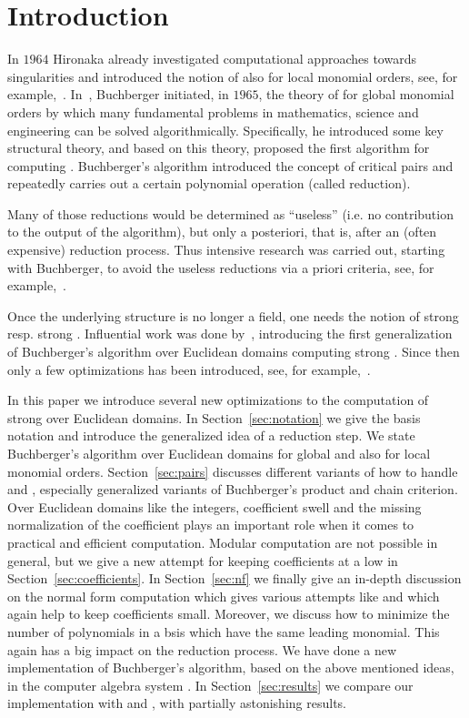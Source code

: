 \section{Introduction}
\label{sec:intro} In $1964$ Hironaka already investigated
computational approaches towards singularities and introduced the notion of
\stbs also for local monomial orders, see, for
example,~\cite{hironaka11964, hironaka21964}.
In~\cite{bGroebner1965, bGroebner1965eng}, Buchberger initiated, in $1965$, the theory
of \gbs for global monomial orders by which many fundamental problems in mathematics, science
and engineering can be solved algorithmically. Specifically, he introduced some key
structural theory, and based on
this theory, proposed the first algorithm for computing \gbs.
Buchberger's algorithm introduced the concept of critical pairs and repeatedly carries out a certain
polynomial operation (called reduction).

Many of those reductions would be
determined as ``useless'' (i.e. no contribution to the output of the algorithm),
but only a posteriori, that is, after an (often expensive) reduction process.
Thus intensive research was carried out, starting with Buchberger, to avoid the
useless reductions via a priori criteria, see,  for
example,~\cite{bGroebnerCriterion1979,buchberger2ndCriterion1985,gmInstallation1988}.

Once the underlying structure is no longer a field, one needs
the notion of strong \gbs resp. strong \stbs. Influential work was done
by~\cite{kapur1988}, introducing the first generalization of Buchberger's
algorithm over Euclidean domains computing strong \gbs. Since then only a few
optimizations has been introduced, see, for example,~\cite{Wienand2011,
    lichtblau2012, eppSigZ2017}.

In this paper we introduce several new optimizations to the computation of
strong \stbs over Euclidean domains. In Section~\ref{sec:notation} we give the
basis notation and introduce the generalized idea of a reduction step. We state
Buchberger's algorithm over Euclidean domains for global and also for local
monomial orders. Section~\ref{sec:pairs} discusses different variants of how to
handle \spts and \gpts, especially generalized variants of Buchberger's product
and chain criterion. Over Euclidean domains like the integers, coefficient swell
and the missing normalization of the coefficient plays an important role when it
comes to practical and efficient computation. Modular computation are not
possible in general, but we give a new attempt for keeping coefficients at a low
in Section~\ref{sec:coefficients}. In Section~\ref{sec:nf} we finally give an
in-depth discussion on the normal form computation which gives various attempts
like \ltrs and \lcrs which again help to keep coefficients small. Moreover, we
discuss how to minimize the number of polynomials in a bsis which have the same
leading monomial. This again has a big impact on the reduction process.
We have done a new implementation of Buchberger's algorithm, based on the above
mentioned ideas, in the computer algebra system \singular. In
Section~\ref{sec:results} we compare our implementation with \macaulay and
\magma, with partially astonishing results.

